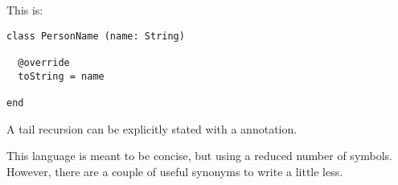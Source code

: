 This is:
\begin{lstlisting}[label={lst:exampleToString}]
class PersonName (name: String)

  @override
  toString = name

end
\end{lstlisting}

A tail recursion can be explicitly stated with a \sodatailrec annotation.

This language is meant to be concise, but using a reduced number of symbols.
However, there are a couple of useful synonyms to write a little less.

